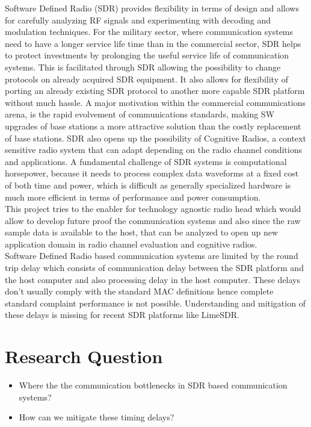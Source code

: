 \documentclass{kththesis}
\begin{document}
Software Defined Radio (SDR) provides flexibility in terms of design and allows for carefully analyzing RF signals and experimenting with decoding and modulation techniques. For the military sector, where communication systems need to have a longer service life time than in the commercial sector, SDR helps to protect investments by prolonging the useful service life of communication systems. This is facilitated through SDR allowing the possibility to change protocols on already acquired SDR equipment. It also allows for flexibility of porting an already existing SDR protocol to another more capable SDR platform without much hassle. A major motivation within the commercial communications arena, is the rapid evolvement of communications standards, making SW upgrades of base stations a more attractive solution than the costly replacement of base stations\cite{ulversoy_software_2010}. SDR also opens up the possibility of Cognitive Radios, a context sensitive radio system that can adapt depending on the radio channel conditions and applications. 
A fundamental challenge of SDR systems is computational horsepower, because it needs to process complex data waveforms at a fixed cost of both time and power, which is difficult as generally specialized hardware is much more efficient in terms of performance and power consumption. \\
This project tries to the enabler for technology agnostic radio head which would allow to develop future proof the communication systems and also since the raw sample data is available to the host, that can be analyzed to open up new application domain in radio channel evaluation and cognitive radios. \\
Software Defined Radio based communication systems are limited by the round trip delay which consists of communication delay between the SDR platform and the host computer and also processing delay in the host computer. These delays don’t usually comply with the standard MAC definitions hence complete standard complaint performance is not possible. Understanding and mitigation of these
delays is missing for recent SDR platforms like LimeSDR.

\section{Research Question}
\begin{itemize}
\item{Where the the communication bottlenecks in SDR based communication systems?}
\item{ How can we mitigate these timing delays?}
\end{itemize} 
\end{document}
